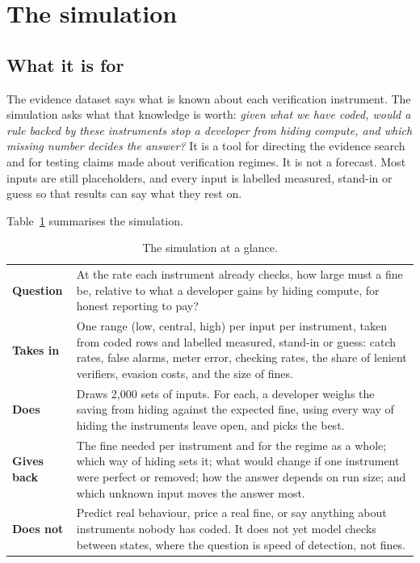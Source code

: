 \documentclass[11pt,a4paper]{article}
\newif\ifhighlight
\newenvironment{addedblock}{\ifhighlight\color{newtext}\fi}{}
\begin{document}
\clearpage
\appendix
\begin{addedblock}
\section{The simulation}
\label{app:sim}

\subsection{What it is for}
The evidence dataset says what is known about each verification instrument. The simulation asks what that knowledge is worth: \emph{given what we have coded, would a rule backed by these instruments stop a developer from hiding compute, and which missing number decides the answer?} It is a tool for directing the evidence search and for testing claims made about verification regimes. It is not a forecast. Most inputs are still placeholders, and every input is labelled measured, stand-in or guess so that results can say what they rest on.

Table~\ref{tab:glance} summarises the simulation.

\begin{table}[H]
\ifhighlight\color{newtext}\fi
\centering
\small
\begin{tabular}{@{}>{\bfseries}p{2.6cm}p{12.2cm}@{}}
\toprule
Question & At the rate each instrument already checks, how large must a fine be, relative to what a developer gains by hiding compute, for honest reporting to pay? \\
\addlinespace
Takes in & One range (low, central, high) per input per instrument, taken from coded rows and labelled measured, stand-in or guess: catch rates, false alarms, meter error, checking rates, the share of lenient verifiers, evasion costs, and the size of fines. \\
\addlinespace
Does & Draws 2,000 sets of inputs. For each, a developer weighs the saving from hiding against the expected fine, using every way of hiding the instruments leave open, and picks the best. \\
\addlinespace
Gives back & The fine needed per instrument and for the regime as a whole; which way of hiding sets it; what would change if one instrument were perfect or removed; how the answer depends on run size; and which unknown input moves the answer most. \\
\addlinespace
Does not & Predict real behaviour, price a real fine, or say anything about instruments nobody has coded. It does not yet model checks between states, where the question is speed of detection, not fines. \\
\bottomrule
\end{tabular}
\caption{The simulation at a glance.}
\label{tab:glance}
\end{table}


\end{addedblock}
\end{document}
